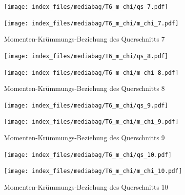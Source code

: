 \documentclass[
  11pt,
  letterpaper,
]{scrreprt}
\begin{document}
\begin{figure}[H]

\begin{minipage}{0.50\linewidth}
\texttt{[image: index\_files/mediabag/T6\_m\_chi/qs\_7.pdf]}\end{minipage}%
%
\begin{minipage}{0.50\linewidth}
\texttt{[image: index\_files/mediabag/T6\_m\_chi/m\_chi\_7.pdf]}\end{minipage}%

\caption{\label{fig-mchi_anhang}Momenten-Krümmungs-Beziehung des
Querschnitts 7}

\end{figure}%

\begin{figure}[H]

\begin{minipage}{0.50\linewidth}
\texttt{[image: index\_files/mediabag/T6\_m\_chi/qs\_8.pdf]}\end{minipage}%
%
\begin{minipage}{0.50\linewidth}
\texttt{[image: index\_files/mediabag/T6\_m\_chi/m\_chi\_8.pdf]}\end{minipage}%

\caption{\label{fig-mchi_anhang}Momenten-Krümmungs-Beziehung des
Querschnitts 8}

\end{figure}%

\begin{figure}[H]

\begin{minipage}{0.50\linewidth}
\texttt{[image: index\_files/mediabag/T6\_m\_chi/qs\_9.pdf]}\end{minipage}%
%
\begin{minipage}{0.50\linewidth}
\texttt{[image: index\_files/mediabag/T6\_m\_chi/m\_chi\_9.pdf]}\end{minipage}%

\caption{\label{fig-mchi_anhang}Momenten-Krümmungs-Beziehung des
Querschnitts 9}

\end{figure}%

\begin{figure}[H]

\begin{minipage}{0.50\linewidth}
\texttt{[image: index\_files/mediabag/T6\_m\_chi/qs\_10.pdf]}\end{minipage}%
%
\begin{minipage}{0.50\linewidth}
\texttt{[image: index\_files/mediabag/T6\_m\_chi/m\_chi\_10.pdf]}\end{minipage}%

\caption{\label{fig-mchi_anhang}Momenten-Krümmungs-Beziehung des
Querschnitts 10}

\end{figure}%
\end{document}

